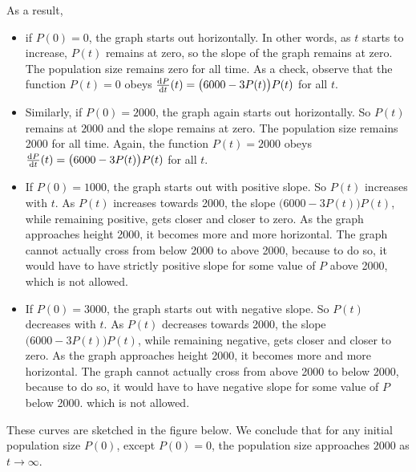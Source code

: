 As a result,
\begin{itemize}
  \item  if $P(0)=0$, the graph starts out horizontally. In other
    words, as $t$ starts to increase, $P(t)$ remains at zero, so the slope
    of the graph remains at zero. The population
    size remains zero for all time. As a check, observe that
    the function $P(t)=0$ obeys $\diff{P}{t}(t)=\big(6000-3P(t)\big)P(t)$
    for all $t$.

  \item  Similarly, if $P(0)=2000$, the graph again starts out
    horizontally. So $P(t)$ remains at $2000$ and the slope remains at zero.
    The population size remains 2000 for all time. Again, the function
    $P(t)=2000$ obeys $\diff{P}{t}(t)=\big(6000-3P(t)\big)P(t)$ for all $t$.

  \item  If $P(0)=1000$, the graph starts out with positive slope.
    So $P(t)$ increases with $t$. As $P(t)$ increases towards 2000, the slope
    $(6000-3P(t)\big)P(t)$, while remaining positive, gets closer and closer
    to zero. As the graph approaches height 2000, it becomes more and more
    horizontal. The graph cannot actually cross from below 2000 to above 2000,
    because to do so, it would have to have strictly positive slope for
    some value of $P$ above 2000, which is not allowed.

  \item  If $P(0)=3000$, the graph starts out with negative slope.
    So $P(t)$ decreases with $t$. As $P(t)$ decreases towards 2000, the slope
    $(6000-3P(t)\big)P(t)$, while remaining negative, gets closer and closer
    to zero. As the graph approaches height 2000, it becomes more and more
    horizontal. The graph cannot actually cross from above 2000 to below 2000,
    because to do so, it would have to have negative slope for some value of
    $P$ below 2000. which is not allowed.
\end{itemize}

\noindent These curves are sketched in the figure below. We conclude that
for any initial population size $P(0)$, except $P(0)=0$, the population
size approaches $2000$ as $t\rightarrow\infty$.

